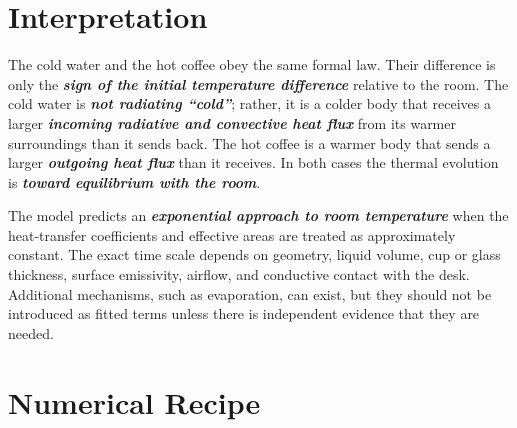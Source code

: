 \documentclass[11pt]{article}
\begin{document}
\section{Interpretation}

The cold water and the hot coffee obey the same formal law. Their difference is only the \textbf{\textit{sign of the initial temperature difference}} relative to the room. The cold water is \textbf{\textit{not radiating ``cold''}}; rather, it is a colder body that receives a larger \textbf{\textit{incoming radiative and convective heat flux}} from its warmer surroundings than it sends back. The hot coffee is a warmer body that sends a larger \textbf{\textit{outgoing heat flux}} than it receives. In both cases the thermal evolution is \textbf{\textit{toward equilibrium with the room}}.

The model predicts an \textbf{\textit{exponential approach to room temperature}} when the heat-transfer coefficients and effective areas are treated as approximately constant. The exact time scale depends on geometry, liquid volume, cup or glass thickness, surface emissivity, airflow, and conductive contact with the desk. Additional mechanisms, such as evaporation, can exist, but they should not be introduced as fitted terms unless there is independent evidence that they are needed.

\section{Numerical Recipe}
\end{document}
